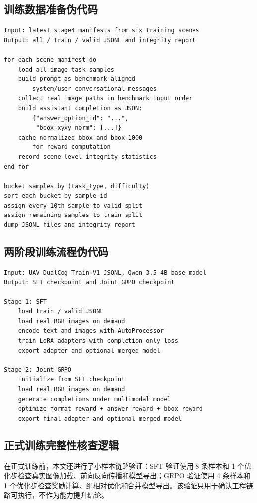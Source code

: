 \begin{thesisappendix}
\subsection{训练数据准备伪代码}

\begin{verbatim}
Input: latest stage4 manifests from six training scenes
Output: all / train / valid JSONL and integrity report

for each scene manifest do
    load all image-task samples
    build prompt as benchmark-aligned
        system/user conversational messages
    collect real image paths in benchmark input order
    build assistant completion as JSON:
        {"answer_option_id": "...",
         "bbox_xyxy_norm": [...]}
    cache normalized bbox and bbox_1000
        for reward computation
    record scene-level integrity statistics
end for

bucket samples by (task_type, difficulty)
sort each bucket by sample id
assign every 10th sample to valid split
assign remaining samples to train split
dump JSONL files and integrity report
\end{verbatim}

\subsection{两阶段训练流程伪代码}

\begin{verbatim}
Input: UAV-DualCog-Train-V1 JSONL, Qwen 3.5 4B base model
Output: SFT checkpoint and Joint GRPO checkpoint

Stage 1: SFT
    load train / valid JSONL
    load real RGB images on demand
    encode text and images with AutoProcessor
    train LoRA adapters with completion-only loss
    export adapter and optional merged model

Stage 2: Joint GRPO
    initialize from SFT checkpoint
    load real RGB images on demand
    generate completions under multimodal model
    optimize format reward + answer reward + bbox reward
    export final adapter and optional merged model
\end{verbatim}

\subsection{正式训练完整性核查逻辑}

在正式训练前，本文还进行了小样本链路验证：SFT 验证使用 8 条样本和 1 个优化步检查真实图像加载、前向反向传播和模型导出；GRPO 验证使用 4 条样本和 1 个优化步检查奖励计算、组相对优化和合并模型导出。该验证只用于确认工程链路可执行，不作为能力提升结论。


\end{thesisappendix}
